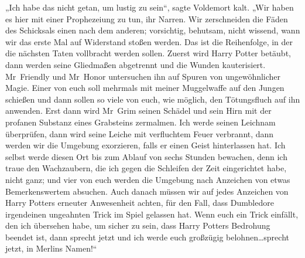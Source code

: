 „Ich habe das nicht getan, um lustig zu sein“, sagte Voldemort kalt.
„Wir haben es hier mit einer Prophezeiung zu tun, ihr Narren. Wir zerschneiden die Fäden des Schicksals einen nach dem anderen; vorsichtig, behutsam, nicht wissend, wann wir das erste Mal auf Widerstand stoßen werden. Das ist die Reihenfolge, in der die nächsten Taten vollbracht werden sollen. Zuerst wird Harry Potter betäubt, dann werden seine Gliedmaßen abgetrennt und die Wunden kauterisiert. Mr~Friendly und Mr~Honor untersuchen ihn auf Spuren von ungewöhnlicher Magie. Einer von euch soll mehrmals mit meiner Muggelwaffe auf den Jungen schießen und dann sollen so viele von euch, wie möglich, den Tötungsfluch auf ihn anwenden. Erst dann wird Mr~Grim seinen Schädel und sein Hirn mit der profanen Substanz eines Grabsteins zermalmen. Ich werde seinen Leichnam überprüfen, dann wird seine Leiche mit verfluchtem Feuer verbrannt, dann werden wir die Umgebung exorzieren, falls er einen Geist hinterlassen hat. Ich selbst werde diesen Ort bis zum Ablauf von sechs Stunden bewachen, denn ich traue den Wachzaubern, die ich gegen die Schleifen der Zeit eingerichtet habe, nicht ganz; und vier von euch werden die Umgebung nach Anzeichen von etwas Bemerkenswertem absuchen. Auch danach müssen wir auf jedes Anzeichen von Harry Potters erneuter Anwesenheit achten, für den Fall, dass Dumbledore irgendeinen ungeahnten Trick im Spiel gelassen hat. Wenn euch ein Trick einfällt, den ich übersehen habe, um sicher zu sein, dass Harry Potters Bedrohung beendet ist, dann sprecht jetzt und ich werde euch großzügig belohnen…sprecht jetzt, in Merlins Namen!“

